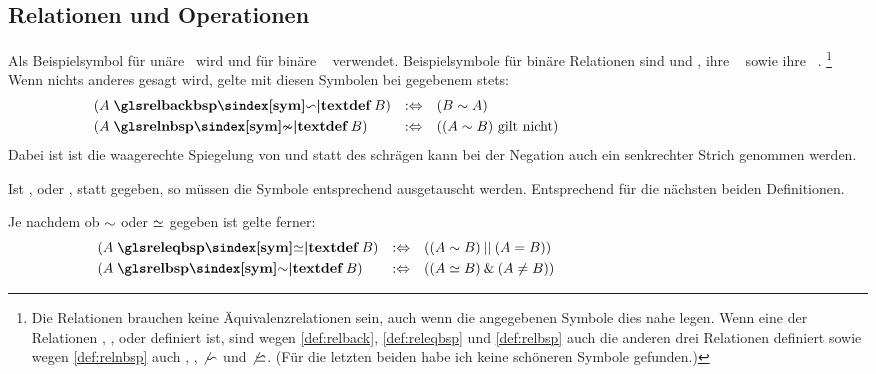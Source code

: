 \subsection{Relationen und Operationen}%
\label{sub:Beispielsymbole}

Als Beispielsymbol für unäre \Operationen\ wird \chrqt{\symopubsp} und für binäre \Operationen\ \chrqt{\symopbsp} verwendet.
Beispielsymbole für binäre Relationen sind \chrqt{\symrelbsp} und \chrqt{\symreleqbsp}, ihre \Umkehrrelationen \chrqt{\symrelbackbsp} \textbzw\ \chrqt{\symrelbackeqbsp} sowie ihre  \chrqt{\symrelnbsp} \textbzw\ \chrqt{\symrelnebsp}.%
\footnote{%
	Die Relationen brauchen keine Äquivalenzrelationen sein, auch wenn die angegebenen Symbole dies nahe legen.
	Wenn eine der Relationen \symrelbsp, \symreleqbsp, \symrelbackbsp oder \symrelbackeqbsp definiert ist, sind wegen \eqref{def:relback}, \eqref{def:releqbsp} und \eqref{def:relbsp} auch die anderen drei Relationen definiert sowie wegen \eqref{def:relnbsp} auch \symrelnbsp, \symrelnebsp, $\not{\mathrel{\backsim}}$ und $\not{\mathrel{\backsimeq}}$.
	(Für die letzten beiden habe ich keine schöneren Symbole gefunden.)
}
Wenn nichts anderes gesagt wird, gelte mit diesen Symbolen bei gegebenem \chrqt{\symrelbsp} stets:
\begin{align}
	& (A \opdefinition{\symrelbackbsp} B) & \metadefeq \quad &  (B \relbsp  A)
	\label{def:relback}  \\
	& (A \opdefinition{\symrelnbsp}    B) & \metadefeq \quad & ((A \relbsp  B) \text{ gilt nicht})
	\label{def:relnbsp}  \formulatoleft\formulatoleft\formulatoleft
\end{align}
Dabei ist \chrqt{\symrelbackbsp} ist die waagerechte Spiegelung von \chrqt{\symrelbsp} und statt des schrägen kann bei der Negation auch ein senkrechter Strich genommen werden.

Ist \chrqt{\symrelbackbsp}, \chrqt{\symreleqbsp} oder \chrqt{\symrelbackeqbsp}, statt \chrqt{\symrelbsp} gegeben, so müssen die Symbole entsprechend ausgetauscht werden.
Entsprechend für die nächsten beiden Definitionen.

Je nachdem ob $\mathrel{\sim}$ oder $\mathrel{\simeq}$ gegeben ist gelte ferner:
\begin{align}
	& (A \opdefinition{\symreleqbsp}   B) & \metadefeq \quad & ((A \relbsp   B) \metaor  (A \eq B))
	\label{def:releqbsp} \\
	& (A \opdefinition{\symrelbsp}     B) & \metadefeq \quad & ((A \releqbsp B) \metaand (A \ne B))
	\label{def:relbsp}   \formulatoleft\formulatoleft\formulatoleft
\end{align}

